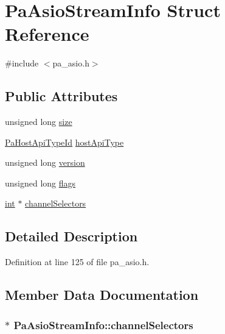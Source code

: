 \hypertarget{struct_pa_asio_stream_info}{}\section{Pa\+Asio\+Stream\+Info Struct Reference}
\label{struct_pa_asio_stream_info}


{\ttfamily \#include $<$pa\+\_\+asio.\+h$>$}

\subsection*{Public Attributes}
\begin{DoxyCompactItemize}
\item 
unsigned long \hyperlink{struct_pa_asio_stream_info_a64b7653dba1527f04b9d1ab3b642687e}{size}
\item 
\hyperlink{portaudio_8h_a8eaebe3d39c5ea45598da8f86dc2e5ae}{Pa\+Host\+Api\+Type\+Id} \hyperlink{struct_pa_asio_stream_info_aa89dc033f30cd1549d33f44074c79358}{host\+Api\+Type}
\item 
unsigned long \hyperlink{struct_pa_asio_stream_info_a1399d6368fe7cfd3297667c1140a24a0}{version}
\item 
unsigned long \hyperlink{struct_pa_asio_stream_info_abcf467d6508d8fbcb4ddbe95d17669f4}{flags}
\item 
\hyperlink{xmltok_8h_a5a0d4a5641ce434f1d23533f2b2e6653}{int} $\ast$ \hyperlink{struct_pa_asio_stream_info_a2a04b8c7166044c009af7fdeca754c4d}{channel\+Selectors}
\end{DoxyCompactItemize}


\subsection{Detailed Description}


Definition at line 125 of file pa\+\_\+asio.\+h.



\subsection{Member Data Documentation}
\subsubsection[{\texorpdfstring{channel\+Selectors}{channelSelectors}}]{$\ast$ Pa\+Asio\+Stream\+Info\+::channel\+Selectors}\hypertarget{struct_pa_asio_stream_info_a2a04b8c7166044c009af7fdeca754c4d}{}\label{struct_pa_asio_stream_info_a2a04b8c7166044c009af7fdeca754c4d}


